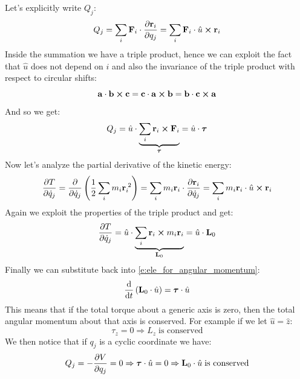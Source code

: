 Let's explicitly write $Q_j$:
\begin{equation}
    Q_j = \bigsum_i \vec{F}_i \cdot \pdv{\vec{r}_i}{q_j} = \bigsum_i \vec{F}_i \cdot \hat{u} \cross \vec{r}_i
\end{equation}
Inside the summation we have a triple product, hence we can exploit the fact that $\hat{u}$ does not depend on $i$ and also the invariance of the triple product with respect to circular shifts:
\begin{equation}
    \vb{a} \cdot \vb{b} \cross \vb{c} = \vb{c} \cdot \vb{a} \cross \vb{b} = \vb{b} \cdot \vb{c} \cross \vb{a}
\end{equation}
And so we get:
\begin{equation}
    Q_j = \hat{u} \cdot \underbrace{\displaystyle\sum_i \vb{r}_i \cross \vb{F}_i}_{\boldsymbol{\tau}} = \hat{u} \cdot \boldsymbol{\tau}
\end{equation}
Now let's analyze the partial derivative of the kinetic energy:
\begin{equation}
    \pdv{T}{\dot{q}_j} = \pdv{}{\dot{q}_j}\brackets{\dfrac{1}{2}\bigsum_i m_i \vec{r}_i^{\;2}} = \bigsum_i m_i \vec{r}_i \cdot \pdv{\vec{r}_i}{\dot{q}_j} = \bigsum_i m_i \vec{r}_i \cdot \hat{u} \cross \vec{r}_i
\end{equation}
Again we exploit the properties of the triple product and get:
\begin{equation}
    \pdv{T}{\dot{q}_j} =   \hat{u} \cdot \underbrace{\bigsum_i \vec{r}_i \cross m_i \vec{r}_i}_{\vec{L}_0} = \hat{u} \cdot \vec{L}_0
\end{equation}
Finally we can substitute back into \eqref{e:ele_for_angular_momentum}:
\begin{equation}
    \dv{}{t}\brackets{\vec{L}_0 \cdot \hat{u}} = \boldsymbol{\tau} \cdot \hat{u}
\end{equation}
This means that if the total torque about a generic axis is zero, then the total angular momentum about that axis is conserved. For example if we let $\hat{u} = \hat{z}$:
\begin{equation}
    \tau_z = 0 \Rightarrow L_z\;\text{is conserved}
\end{equation}
We then notice that if $q_j$ is a cyclic coordinate we have:
\begin{equation}
    Q_j = -\pdv{V}{q_j} = 0 \Rightarrow \boldsymbol{\tau} \cdot \hat{u} = 0 \Rightarrow \vec{L}_0 \cdot \hat{u}\;\text{is conserved}
\end{equation}

